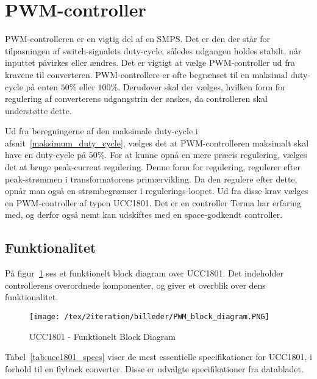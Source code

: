 
\section{PWM-controller} \label{PWM}
PWM-controlleren er en vigtig del af en SMPS. Det er den der står for tilpasningen af switch-signalets duty-cycle, således udgangen holdes stabilt, når inputtet påvirkes eller ændres. Det er vigtigt at vælge PWM-controller ud fra kravene til converteren. PWM-controllere er ofte begrænset til en maksimal duty-cycle på enten $50\percent$ eller $100\percent$. Derudover skal der vælges, hvilken form for regulering af converterens udgangstrin der ønskes, da controlleren skal understøtte dette. 

Ud fra beregningerne af den maksimale duty-cycle i afsnit~\ref{maksimum_duty_cycle}, vælges det at PWM-controlleren maksimalt skal have en duty-cycle på $50\percent$. For at kunne opnå en mere præcis regulering, vælges det at bruge peak-current regulering. Denne form for regulering, regulerer efter peak-strømmen i transformatorens primærvikling. Da den regulere efter dette, opnår man også en strømbegrænser i regulerings-loopet. Ud fra disse krav vælges en PWM-controller af typen UCC1801\cite{UCC1801}. Det er en controller Terma har erfaring med, og derfor også nemt kan udskiftes med en space-godkendt controller.

\subsection{Funktionalitet}
På figur~\ref{fig:PWM_block_diagram} ses et funktionelt block diagram over UCC1801. Det indeholder controllerens overordnede komponenter, og giver et overblik over dens funktionalitet. 

\begin{figure}[H]
	\center
	\texttt{[image: /tex/2iteration/billeder/PWM\_block\_diagram.PNG]}
	\caption{UCC1801 - Funktionelt Block Diagram}
	\label{fig:PWM_block_diagram}
\end{figure}

Tabel~\ref{tab:ucc1801_specs} viser de mest essentielle specifikationer for UCC1801, i forhold til en flyback converter. Disse er udvalgte specifikationer fra databladet.

